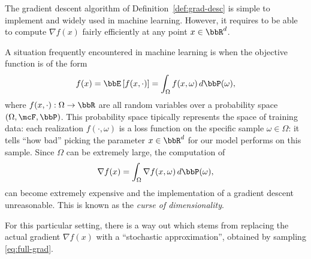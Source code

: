      The gradient descent algorithm of Definition~\ref{def:grad-desc} is simple to implement and widely used in machine learning. However, it requires to be able to compute $\nabla f(x)$ fairly efficiently at any point $x\in\bbR^d$.
 
     A situation frequently encountered in machine learning is when the objective function is of the form
     \begin{equation}
         \label{eq:loss}
         f(x) = \bbE \left[f(x,\cdot)\right] = \int_\Omega f(x,\omega)\, d\bbP(\omega),
     \end{equation}
     where $f(x,\cdot):\Omega\to \bbR$ are all random variables over a probability space $(\Omega,\mcF, \bbP)$.
     This probability space tipically represents the space of training data: each realization $f(\cdot,\omega)$ is a loss function on the specific sample $\omega\in \Omega$: it tells ``how bad'' picking the parameter $x\in\bbR^d$ for our model performs on this sample.
     Since $\Omega$ can be extremely large,  the computation of
     \begin{equation}
         \label{eq:full-grad}
         \nabla f(x) = \int_{\Omega} \nabla f(x,\omega) \, d\bbP(\omega),
     \end{equation}
     can become extremely expensive and the implementation of a gradient descent unreasonable.
     This is known as the \emph{curse of dimensionality}.
 
 
     For this particular setting, there is a way out which stems from replacing the actual gradient $\nabla f(x)$ with a ``stochastic approximation'', obtained by sampling \eqref{eq:full-grad}.
 
